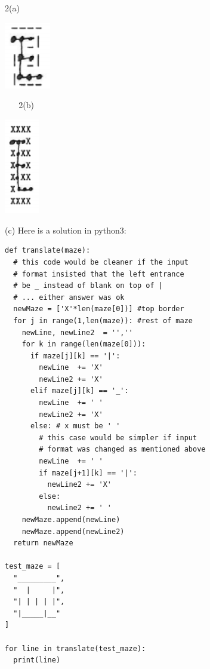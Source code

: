 \documentclass[12pt]{article}
\begin{document}
\newpage
\begin{minipage}[c]{1cm}
2(a) 
\end{minipage}
\begin{minipage}[c]{3cm}
\includegraphics[width=20mm]{maze/a.eps}\
\end{minipage}
\begin{minipage}[c]{2cm}
~ ~ 2(b) 
\end{minipage}
\begin{minipage}[c]{3cm}
\includegraphics[width=15mm]{maze/b.eps}\
\end{minipage}

(c) Here is a solution in python3:

{\small
\begin{verbatim}
def translate(maze):
  # this code would be cleaner if the input
  # format insisted that the left entrance
  # be _ instead of blank on top of |
  # ... either answer was ok
  newMaze = ['X'*len(maze[0])] #top border
  for j in range(1,len(maze)): #rest of maze
    newLine, newLine2  = '',''
    for k in range(len(maze[0])):
      if maze[j][k] == '|':
        newLine  += 'X'
        newLine2 += 'X'
      elif maze[j][k] == '_':
        newLine  += ' '
        newLine2 += 'X'
      else: # x must be ' '
        # this case would be simpler if input
        # format was changed as mentioned above
        newLine  += ' '
        if maze[j+1][k] == '|':
          newLine2 += 'X'
        else:
          newLine2 += ' '
    newMaze.append(newLine)
    newMaze.append(newLine2)
  return newMaze

test_maze = [
  "_________",
  "  |     |",
  "| | | | |",
  "|_____|__"
]

for line in translate(test_maze): 
  print(line)
\end{verbatim}}
\end{document}
